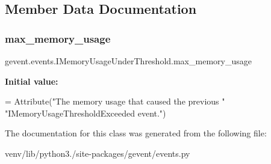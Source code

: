 \subsection{Member Data Documentation}
\mbox{\label{classgevent_1_1events_1_1_i_memory_usage_under_threshold_af49d484b8adc0afaa9d819c9a00b7848}} 
\subsubsection{\texorpdfstring{max\+\_\+memory\+\_\+usage}{max\_memory\_usage}}
{\footnotesize\ttfamily gevent.\+events.\+I\+Memory\+Usage\+Under\+Threshold.\+max\+\_\+memory\+\_\+usage\hspace{0.3cm}{\ttfamily [static]}}

{\bfseries Initial value\+:}
\begin{DoxyCode}
=  Attribute(\textcolor{stringliteral}{"The memory usage that caused the previous "}
                                 \textcolor{stringliteral}{"IMemoryUsageThresholdExceeded event."})
\end{DoxyCode}


The documentation for this class was generated from the following file\+:\begin{DoxyCompactItemize}
\item 
venv/lib/python3./site-\/packages/gevent/events.\+py\end{DoxyCompactItemize}
